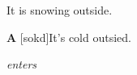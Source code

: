 It is snowing outside.

\begin{dialogue}{\textbf{A}}
    [sokd]It's cold outsied. 
\end{dialogue}
\emph{enters}